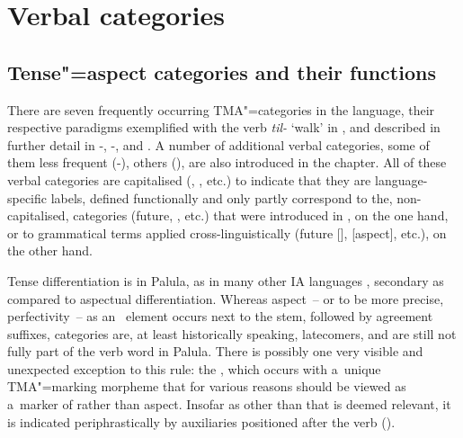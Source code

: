 \chapter{Verbal categories}
\label{chap:9}

\section{Tense"=aspect categories and their functions}
\label{sec:9-1}


There are seven frequently occurring TMA"=categories in the language, their respective paradigms exemplified with the verb \textit{til-} `walk' in , and described in further detail in -, -, and . A number of additional verbal categories, some of them less frequent (-), others  (), are also introduced in the chapter. All of these verbal categories are capitalised (, , etc.) to indicate that they are language-specific labels, defined functionally and only partly correspond to the, non-capitalised,  categories (future, , etc.) that were introduced in , on the one hand, or to grammatical terms applied cross-linguistically (future [],  [aspect], etc.), on the other hand.  


Tense differentiation is in Palula, as in many other IA languages \citep[262]{masica1991}, secondary as compared to aspectual differentiation. Whereas aspect~-- or to be more precise, perfectivity~-- as an~ element occurs next to the stem, followed by agreement suffixes,  categories are, at least historically speaking, latecomers, and are still not fully part of the verb word in Palula. There is possibly one very visible and unexpected exception to this rule: the , which occurs with a~unique TMA"=marking morpheme that for various reasons should be viewed as a~marker of  rather than aspect. Insofar as  other than that is deemed relevant, it is indicated periphrastically by auxiliaries positioned after the  verb (). 


